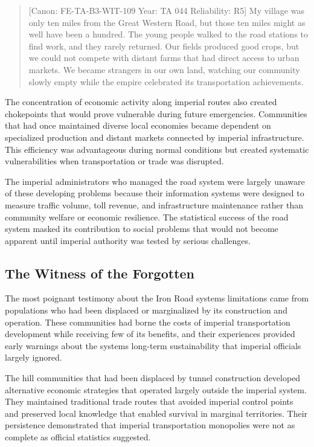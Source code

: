 \begin{quote}
{[}Canon: FE-TA-B3-WIT-109 \textbar{} Year: TA 044 \textbar{}
Reliability: R5{]} My village was only ten miles from the Great Western
Road, but those ten miles might as well have been a hundred. The young
people walked to the road stations to find work, and they rarely
returned. Our fields produced good crops, but we could not compete with
distant farms that had direct access to urban markets. We became
strangers in our own land, watching our community slowly empty while the
empire celebrated its transportation achievements.
\end{quote}

The concentration of economic activity along imperial routes also
created chokepoints that would prove vulnerable during future
emergencies. Communities that had once maintained diverse local
economies became dependent on specialized production and distant markets
connected by imperial infrastructure. This efficiency was advantageous
during normal conditions but created systematic vulnerabilities when
transportation or trade was disrupted.

The imperial administrators who managed the road system were largely
unaware of these developing problems because their information systems
were designed to measure traffic volume, toll revenue, and
infrastructure maintenance rather than community welfare or economic
resilience. The statistical success of the road system masked its
contribution to social problems that would not become apparent until
imperial authority was tested by serious challenges.

\subsection{The Witness of the
Forgotten}\label{the-witness-of-the-forgotten}

The most poignant testimony about the Iron Road system\textquotesingle s
limitations came from populations who had been displaced or marginalized
by its construction and operation. These communities had borne the costs
of imperial transportation development while receiving few of its
benefits, and their experiences provided early warnings about the
system\textquotesingle s long-term sustainability that imperial
officials largely ignored.

The hill communities that had been displaced by tunnel construction
developed alternative economic strategies that operated largely outside
the imperial system. They maintained traditional trade routes that
avoided imperial control points and preserved local knowledge that
enabled survival in marginal territories. Their persistence demonstrated
that imperial transportation monopolies were not as complete as official
statistics suggested.

